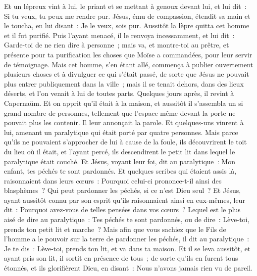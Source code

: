 \begin{multicols}{2}
Et un lépreux vint à lui, le priant et se mettant à genoux devant lui, et lui dit~: Si tu veux, tu peux me rendre pur.
Jésus, ému de compassion, étendit sa main et le toucha, en lui disant~: Je le veux, sois pur.
Aussitôt la lèpre quitta cet homme et il fut purifié.
Puis l'ayant menacé, il le renvoya incessamment,
et lui dit~: Garde-toi de ne rien dire à personne~; mais va, et montre-toi au prêtre, et présente pour ta purification les choses que Moïse a commandées, pour leur servir de témoignage.
Mais cet homme, s'en étant allé, commença à publier ouvertement plusieurs choses et à divulguer ce qui s'était passé, de sorte que Jésus ne pouvait plus entrer publiquement dans la ville~; mais il se tenait dehors, dans des lieux déserts, et l'on venait à lui de toutes parts.
\VerseOne{}Quelques jours après, il revint à Capernaüm. Et on apprit qu'il était à la maison,
et aussitôt il s'assembla un si grand nombre de personnes, tellement que l'espace même devant la porte ne pouvait plus les contenir. Il leur annonçait la parole.
Et quelques-uns vinrent à lui, amenant un paralytique qui était porté par quatre personnes.
Mais parce qu'ils ne pouvaient s'approcher de lui à cause de la foule, ils découvrirent le toit du lieu où il était, et l'ayant percé, ils descendirent le petit lit dans lequel le paralytique était couché.
Et Jésus, voyant leur foi, dit au paralytique~: Mon enfant, tes péchés te sont pardonnés.
Et quelques scribes qui étaient assis là, raisonnaient dans leurs cœurs~:
Pourquoi celui-ci prononce-t-il ainsi des blasphèmes~? Qui peut pardonner les péchés, si ce n'est Dieu seul~?
Et Jésus, ayant aussitôt connu par son esprit qu'ils raisonnaient ainsi en eux-mêmes, leur dit~: Pourquoi avez-vous de telles pensées dans vos cœurs~?
Lequel est le plus aisé de dire au paralytique~: Tes péchés te sont pardonnés, ou de dire~: Lève-toi, prends ton petit lit et marche~?
Mais afin que vous sachiez que le Fils de l'homme a le pouvoir sur la terre de pardonner les péchés, il dit au paralytique~:
Je te dis~: Lève-toi, prends ton lit, et va dans ta maison.
Et il se leva aussitôt, et ayant pris son lit, il sortit en présence de tous~; de sorte qu'ils en furent tous étonnés, et ils glorifièrent Dieu, en disant~: Nous n'avons jamais rien vu de pareil.

\end{multicols}
